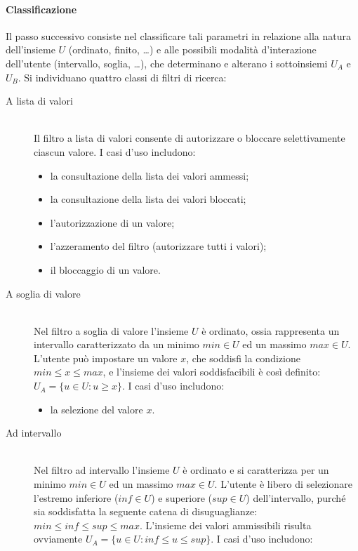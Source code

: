 \paragraph{Classificazione}
Il passo successivo consiste nel classificare tali parametri in relazione alla natura dell'insieme $U$ (ordinato, finito, \ldots) e alle possibili modalità d'interazione dell'utente (intervallo, soglia, \ldots), che determinano e alterano i sottoinsiemi $U_A$ e $U_B$. Si individuano quattro classi di filtri di ricerca:
\begin{description}
	\item[A lista di valori] \hfill \\
	Il filtro a lista di valori consente di autorizzare o bloccare selettivamente ciascun valore. I casi d'uso includono:
	\begin{itemize}
		\item la consultazione della lista dei valori ammessi;
		\item la consultazione della lista dei valori bloccati;
		\item l'autorizzazione di un valore;
		\item l'azzeramento del filtro (autorizzare tutti i valori);
		\item il bloccaggio di un valore.
	\end{itemize}
	\item[A soglia di valore] \hfill \\
	Nel filtro a soglia di valore l'insieme $U$ è ordinato, ossia rappresenta un intervallo caratterizzato da un minimo $min \in U$ ed un massimo $max \in U$. L'utente può impostare un valore $x$, che soddisfi la condizione $min \leq x \leq max$, e l'insieme dei valori soddisfacibili è così definito: $U_A = \lbrace u \in U : u \geq x \rbrace$. I casi d'uso includono:
	\begin{itemize}
		\item la selezione del valore $x$.
	\end{itemize}
	\item[Ad intervallo] \hfill \\
	Nel filtro ad intervallo l'insieme $U$ è ordinato e si caratterizza per un minimo $min \in U$ ed un massimo $max \in U$. L'utente è libero di selezionare l'estremo inferiore ($inf \in U$) e superiore ($sup\in U$) dell'intervallo, purché sia soddisfatta la seguente catena di disuguaglianze: $min \leq inf \leq sup \leq max$. L'insieme dei valori ammissibili risulta ovviamente $U_A = \lbrace u \in U : inf \leq u \leq sup \rbrace$. I casi d'uso includono:

\end{description}

